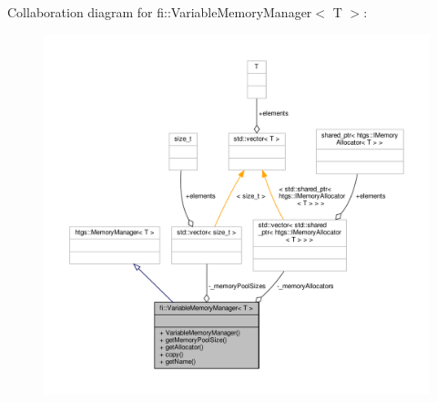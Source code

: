 Collaboration diagram for fi\+:\+:Variable\+Memory\+Manager$<$ T $>$\+:
\nopagebreak
\begin{figure}[H]
\begin{center}
\leavevmode
\includegraphics[width=350pt]{de/d99/classfi_1_1VariableMemoryManager__coll__graph}
\end{center}
\end{figure}
